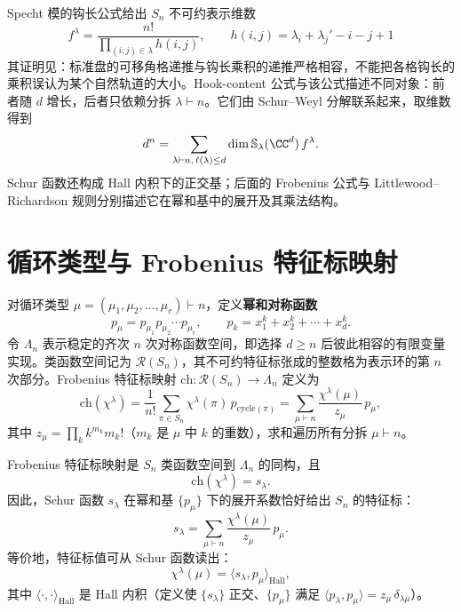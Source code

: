 


Specht 模的钩长公式给出 $S_n$ 不可约表示维数
\[
f^\lambda=\frac{n!}{\prod_{(i,j)\in\lambda}h(i,j)},\qquad
h(i,j)=\lambda_i+\lambda_j'-i-j+1
\]
其证明见：标准盘的可移角格递推与钩长乘积的递推严格相容，不能把各格钩长的乘积误认为某个自然轨道的大小。Hook-content 公式与该公式描述不同对象：前者随 $d$ 增长，后者只依赖分拆 $\lambda\vdash n$。它们由 Schur--Weyl 分解联系起来，取维数得到
\[
d^n=\sum_{\lambda\vdash n,\,\ell(\lambda)\le d}
\dim\mathbb S_\lambda(\CC^d)\,f^\lambda.
\]
Schur 函数还构成 Hall 内积下的正交基；后面的 Frobenius 公式与 Littlewood--Richardson 规则分别描述它在幂和基中的展开及其乘法结构。

\section{循环类型与 Frobenius 特征标映射}

\begin{definition}[幂和对称函数与特征标映射]
对循环类型 $\mu=(\mu_1,\mu_2,\dots,\mu_r)\vdash n$，定义\textbf{幂和对称函数}
\begin{equation}
p_\mu=p_{\mu_1}p_{\mu_2}\cdots p_{\mu_r},
\qquad
p_k=x_1^k+x_2^k+\cdots+x_d^k.
\label{eq:power-sum-symmetric}
\end{equation}
令 $\Lambda_n$ 表示稳定的齐次 $n$ 次对称函数空间，即选择 $d\ge n$ 后彼此相容的有限变量实现。类函数空间记为 $\mathcal R(S_n)$，其不可约特征标张成的整数格为表示环的第 $n$ 次部分。Frobenius 特征标映射 $\mathrm{ch}:\mathcal R(S_n)\to\Lambda_n$ 定义为
\begin{equation}
\mathrm{ch}(\chi^\lambda)=\frac{1}{n!}\sum_{\pi\in S_n}\chi^\lambda(\pi)\,p_{\mathrm{cycle}(\pi)}
=\sum_{\mu\vdash n}\frac{\chi^\lambda(\mu)}{z_\mu}\,p_\mu,
\label{eq:frobenius-character-map}
\end{equation}
其中 $z_\mu=\prod_k k^{m_k}m_k!$（$m_k$ 是 $\mu$ 中 $k$ 的重数），求和遍历所有分拆 $\mu\vdash n$。
\label{def:frobenius-character-map}
\end{definition}

\begin{theorem}
Frobenius 特征标映射是 $S_n$ 类函数空间到 $\Lambda_n$ 的同构，且
\begin{equation}
\mathrm{ch}(\chi^\lambda)=s_\lambda.
\label{eq:frobenius-formula}
\end{equation}
因此，Schur 函数 $s_\lambda$ 在幂和基 $\{p_\mu\}$ 下的展开系数恰好给出 $S_n$ 的特征标：
\begin{equation}
s_\lambda=\sum_{\mu\vdash n}\frac{\chi^\lambda(\mu)}{z_\mu}\,p_\mu.
\label{eq:schur-power-sum-expansion}
\end{equation}
等价地，特征标值可从 Schur 函数读出：
\begin{equation}
\chi^\lambda(\mu)=\bigl\langle s_\lambda,p_\mu\bigr\rangle_{\mathrm{Hall}},
\label{eq:character-from-schur}
\end{equation}
其中 $\langle\cdot,\cdot\rangle_{\mathrm{Hall}}$ 是 Hall 内积（定义使 $\{s_\lambda\}$ 正交、$\{p_\mu\}$ 满足 $\langle p_\lambda,p_\mu\rangle=z_\mu\,\delta_{\lambda\mu}$）。
\label{thm:frobenius-formula}
\end{theorem}

